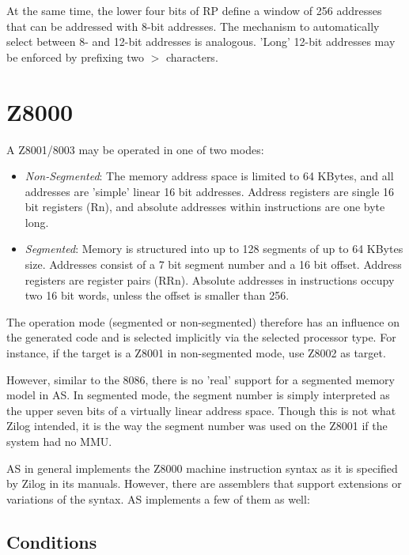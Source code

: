 \documentclass[12pt,twoside]{report}
\newcommand{\asname}{{AS}}
\begin{document}
At the same time, the lower four bits of RP define a window of 256
addresses that can be addressed with 8-bit addresses.  The mechanism
to automatically select between 8- and 12-bit addresses is analogous.
'Long' 12-bit addresses may be enforced by prefixing two $>$
characters.


\section{Z8000}
\label{Z8000Spec}

A Z8001/8003 may be operated in one of two modes:

\begin{itemize}
\item{{\em Non-Segmented}: The memory address space is limited to 64 KBytes,
      and all addresses are 'simple' linear 16 bit addresses.  Address
      registers are single 16 bit registers (Rn), and absolute addresses
      within instructions are one byte long.}
\item{{\em Segmented}: Memory is structured into up to 128 segments of up
      to 64 KBytes size.  Addresses consist of a 7 bit segment number and a
      16 bit offset. Address registers are register pairs (RRn).  Absolute
      addresses in instructions occupy two 16 bit words, unless the offset
      is smaller than 256.}
\end{itemize}

The operation mode (segmented or non-segmented) therefore has an influence
on the generated code and is selected implicitly via the selected processor
type.  For instance, if the target is a Z8001 in non-segmented mode, use
Z8002 as target.

However, similar to the 8086, there is no 'real' support for a segmented
memory model in \asname{}. In segmented mode, the segment number is simply interpreted
as the upper seven bits of a virtually linear address space.  Though this is
not what Zilog intended, it is the way the segment number was used on the
Z8001 if the system had no MMU.

\asname{} in general implements the Z8000 machine instruction syntax as it is specified
by Zilog in its manuals.  However, there are assemblers that support extensions
or variations of the syntax.  \asname{} implements a few of them as well:

\subsection{Conditions}
\end{document}
